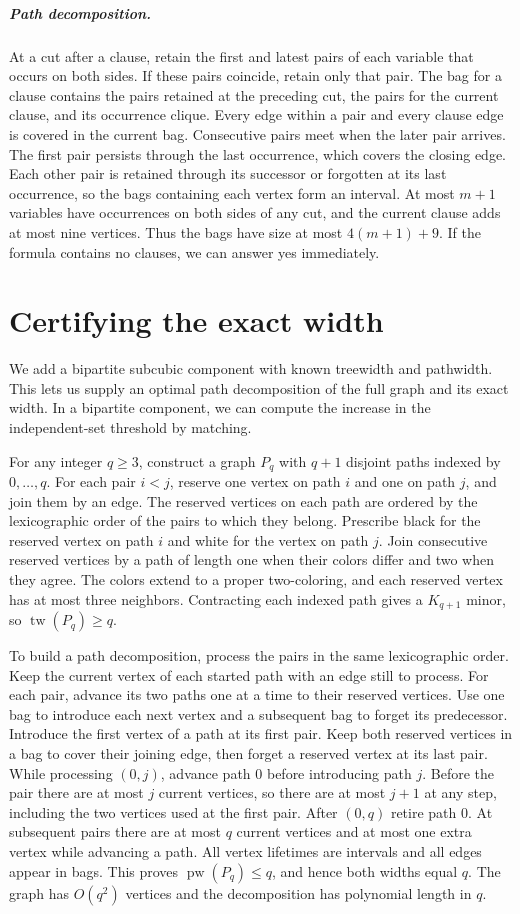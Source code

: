 \documentclass[11pt]{article}
\begin{document}
\subparagraph{Path decomposition.}
At a cut after a clause, retain the first and latest pairs of each
variable that occurs on both sides. If these pairs coincide, retain
only that pair. The bag for a clause contains the pairs retained at
the preceding cut, the pairs for the current clause, and its occurrence
clique. Every edge within a pair and every clause edge is covered in
the current bag. Consecutive pairs meet when the later pair arrives.
The first pair persists through the last occurrence, which covers the
closing edge. Each other pair is retained through its successor or
forgotten at its last occurrence, so the bags containing each vertex
form an interval. At most \(m+1\) variables have occurrences on both
sides of any cut, and the current clause adds at most nine vertices.
Thus the bags have size at most \(4(m+1)+9\).
If the formula contains no clauses, we can answer yes immediately.

\section{Certifying the exact width}

We add a bipartite subcubic component with known treewidth and pathwidth.
This lets us supply an optimal path decomposition of the full graph
and its exact width. In a bipartite component, we can compute the
increase in the independent-set threshold by matching.

For any integer \(q\ge 3\), construct a graph \(P_q\) with \(q+1\)
disjoint paths indexed by \(0,\ldots,q\). For each pair \(i<j\), reserve
one vertex on path \(i\) and one on path \(j\), and join them by an
edge. The reserved vertices on each path are ordered by the lexicographic
order of the pairs to which they belong. Prescribe black for the
reserved vertex on path \(i\) and white for the vertex on path \(j\).
Join consecutive reserved vertices by a path of length one when their
colors differ and two when they agree. The colors extend to a proper
two-coloring, and each reserved vertex has at most three neighbors.
Contracting each indexed path gives a \(K_{q+1}\) minor, so
\(\operatorname{tw}(P_q)\ge q\).

To build a path decomposition, process the pairs in the same
lexicographic order. Keep the current vertex of each started path
with an edge still to process. For each pair, advance its two paths
one at a time to their reserved vertices. Use one bag to introduce
each next vertex and a subsequent bag to forget its predecessor.
Introduce the first vertex of a path at its first pair. Keep both
reserved vertices in a bag to cover their joining edge, then forget
a reserved vertex at its last pair. While processing \((0,j)\),
advance path \(0\) before introducing path \(j\). Before the pair
there are at most \(j\) current vertices, so there are at most
\(j+1\) at any step, including the two vertices used at the first
pair. After \((0,q)\) retire path \(0\). At subsequent pairs there are
at most \(q\) current vertices and at most one extra vertex while
advancing a path. All vertex lifetimes are intervals and all edges
appear in bags. This proves \(\operatorname{pw}(P_q)\le q\), and hence
both widths equal \(q\). The graph has \(O(q^2)\) vertices and the
decomposition has polynomial length in \(q\).
\end{document}
